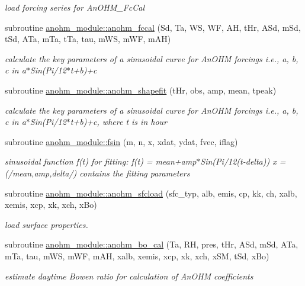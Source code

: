 \begin{DoxyCompactItemize}
\begin{DoxyCompactList}\small\item\em load forcing series for An\+O\+H\+M\+\_\+\+Fc\+Cal \end{DoxyCompactList}\item 
subroutine \hyperlink{namespaceanohm__module_afed396f8cec94d18f3c6bec4a2a879eb}{anohm\+\_\+module\+::anohm\+\_\+fccal} (Sd, Ta, WS, WF, AH, t\+Hr, A\+Sd, m\+Sd, t\+Sd, A\+Ta, m\+Ta, t\+Ta, tau, m\+WS, m\+WF, m\+AH)
\begin{DoxyCompactList}\small\item\em calculate the key parameters of a sinusoidal curve for An\+O\+HM forcings i.\+e., a, b, c in a$\ast$\+Sin(Pi/12$\ast$t+b)+c \end{DoxyCompactList}\item 
subroutine \hyperlink{namespaceanohm__module_aec263fe8fda2e14111cd3f27a607cff0}{anohm\+\_\+module\+::anohm\+\_\+shapefit} (t\+Hr, obs, amp, mean, tpeak)
\begin{DoxyCompactList}\small\item\em calculate the key parameters of a sinusoidal curve for An\+O\+HM forcings i.\+e., a, b, c in a$\ast$\+Sin(Pi/12$\ast$t+b)+c, where t is in hour \end{DoxyCompactList}\item 
subroutine \hyperlink{namespaceanohm__module_a8d56836cb99e49028266fac2beaf5b95}{anohm\+\_\+module\+::fsin} (m, n, x, xdat, ydat, fvec, iflag)
\begin{DoxyCompactList}\small\item\em sinusoidal function f(t) for fitting\+: f(t) = mean+amp$\ast$\+Sin(Pi/12(t-\/delta)) x = (/mean,amp,delta/) contains the fitting parameters \end{DoxyCompactList}\item 
subroutine \hyperlink{namespaceanohm__module_aa417a23b56e0ed503452ac26f3de9886}{anohm\+\_\+module\+::anohm\+\_\+sfcload} (sfc\+\_\+typ, alb, emis, cp, kk, ch, xalb, xemis, xcp, xk, xch, x\+Bo)
\begin{DoxyCompactList}\small\item\em load surface properties. \end{DoxyCompactList}\item 
subroutine \hyperlink{namespaceanohm__module_a7c747a2204089f0681ae47c92bf7d1e0}{anohm\+\_\+module\+::anohm\+\_\+bo\+\_\+cal} (Ta, RH, pres, t\+Hr, A\+Sd, m\+Sd, A\+Ta, m\+Ta, tau, m\+WS, m\+WF, m\+AH, xalb, xemis, xcp, xk, xch, x\+SM, t\+Sd, x\+Bo)
\begin{DoxyCompactList}\small\item\em estimate daytime Bowen ratio for calculation of An\+O\+HM coefficients \end{DoxyCompactList}\item 

\end{DoxyCompactItemize}

